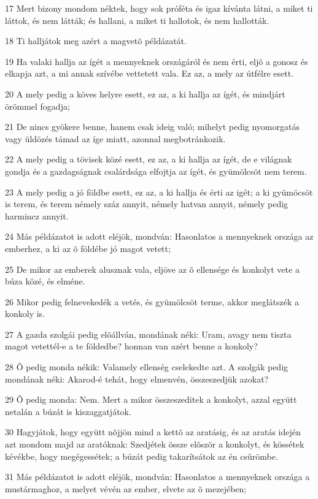 \par 17 Mert bizony mondom néktek, hogy sok próféta és igaz kívánta látni, a miket ti láttok, és nem látták; és hallani, a miket ti hallotok, és nem hallották.
\par 18 Ti halljátok meg azért a magvetõ példázatát.
\par 19 Ha valaki hallja az ígét a mennyeknek országáról és nem érti, eljõ a gonosz és elkapja azt, a mi annak szívébe vettetett vala. Ez az, a mely az útfélre esett.
\par 20 A mely pedig a köves helyre esett, ez az, a ki hallja az ígét, és mindjárt örömmel fogadja;
\par 21 De nincs gyökere benne, hanem csak ideig való; mihelyt pedig nyomorgatás vagy üldözés támad az íge miatt, azonnal megbotránkozik.
\par 22 A mely pedig a tövisek közé esett, ez az, a ki hallja az ígét, de e világnak gondja és a gazdagságnak csalárdsága elfojtja az ígét, és gyümölcsöt nem terem.
\par 23 A mely pedig a jó földbe esett, ez az, a ki hallja és érti az igét; a ki gyümöcsöt is terem, és terem némely száz annyit, némely hatvan annyit, némely pedig harmincz annyit.
\par 24 Más példázatot is adott eléjök, mondván: Hasonlatos a mennyeknek országa az emberhez, a ki az õ földébe jó magot vetett;
\par 25 De mikor az emberek alusznak vala, eljöve az õ ellensége és konkolyt vete a búza közé, és elméne.
\par 26 Mikor pedig felnevekedék a vetés, és gyümölcsöt terme, akkor meglátszék a konkoly is.
\par 27 A gazda szolgái pedig elõállván, mondának néki: Uram, avagy nem tiszta magot vetettél-e a te földedbe? honnan van azért benne a konkoly?
\par 28 Õ pedig monda nékik: Valamely ellenség cselekedte azt. A szolgák pedig mondának néki: Akarod-é tehát, hogy elmenvén, összeszedjük azokat?
\par 29 Õ pedig monda: Nem. Mert a mikor összeszeditek a konkolyt, azzal együtt netalán a búzát is kiszaggatjátok.
\par 30 Hagyjátok, hogy együtt nõjjön mind a kettõ az aratásig, és az aratás idején azt mondom majd az aratóknak: Szedjétek össze elõször a konkolyt, és kössétek kévékbe, hogy megégessétek; a búzát pedig takarítsátok az én csûrömbe.
\par 31 Más példázatot is adott eléjök, mondván: Hasonlatos a mennyeknek országa a mustármaghoz, a melyet vévén az ember, elvete az õ mezejében;
